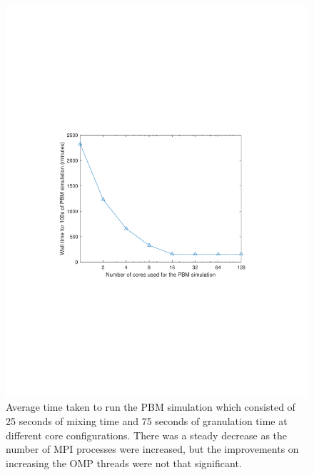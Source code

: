 \documentclass[preprint,11pt,authoryear]{elsarticle}
\begin{document}
\begin{figure}
\centering
\includegraphics[scale=0.75]{rslsts_PBM_timing.pdf}
\caption{Average time taken to run the PBM simulation which consisted of 25 seconds of mixing time 
and 75 seconds of granulation time at different core configurations. There was a steady decrease as 
the number of MPI processes were increased, but the improvements on increasing the OMP threads were 
not that significant.}
\label{fig:rslts_PBM_timing_studies}
\end{figure}
\end{document}
